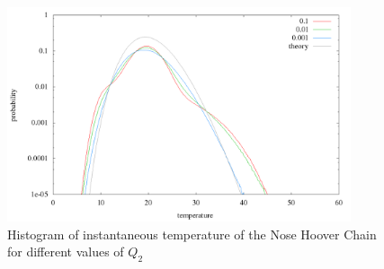 \begin{figure}[H]
\centering
\includegraphics[width=0.9\textwidth]{./graphics/Histogramm_tempCol_one_Chain.png}
\caption{Histogram of instantaneous temperature of the Nose Hoover Chain for different values of $Q_2$ }
\label{im:temp_chain}
\end{figure}



